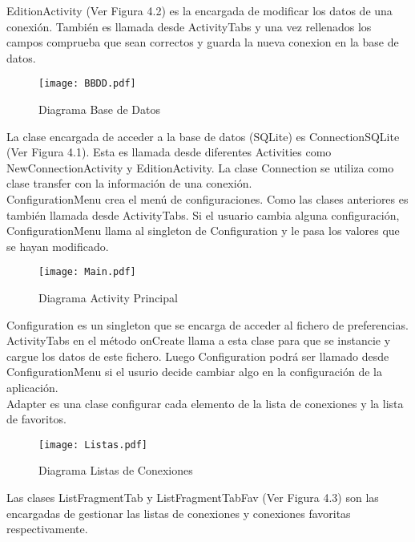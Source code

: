 EditionActivity (Ver Figura 4.2) es la encargada de modificar los datos de una conexión. También es llamada desde ActivityTabs y una vez rellenados los campos comprueba que sean correctos y guarda la nueva conexion en la base de datos.

\begin{figure}[h]
\begin{center}
\texttt{[image: BBDD.pdf]}
\end{center}
\caption{Diagrama Base de Datos}
\end{figure}

La clase encargada de acceder a la base de datos (SQLite) es ConnectionSQLite (Ver Figura 4.1). Esta es llamada desde diferentes Activities como NewConnectionActivity y EditionActivity. La clase Connection se utiliza como clase transfer con la información de una conexión.\\

ConfigurationMenu crea el menú de configuraciones. Como las clases anteriores es también llamada desde ActivityTabs. Si el usuario cambia alguna configuración, ConfigurationMenu llama al singleton de Configuration y le pasa los valores que se hayan modificado.

\begin{figure}[h]
\begin{center}
\texttt{[image: Main.pdf]}
\end{center}
\caption{Diagrama Activity Principal}
\end{figure}

Configuration es un singleton que se encarga de acceder al fichero de preferencias. ActivityTabs en el método onCreate llama a esta clase para que se instancie y cargue los datos de este fichero. Luego Configuration podrá ser llamado desde ConfigurationMenu si el usurio decide cambiar algo en la configuración de la aplicación.\\

Adapter es una clase configurar cada elemento de la lista de conexiones y la lista de favoritos.\\

\begin{figure}[h]
\begin{center}
\texttt{[image: Listas.pdf]}
\end{center}
\caption{Diagrama Listas de Conexiones}
\end{figure}

Las clases ListFragmentTab y ListFragmentTabFav (Ver Figura 4.3) son las encargadas de gestionar las listas de conexiones y conexiones favoritas respectivamente.\\

